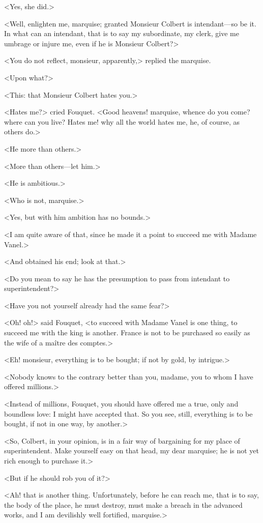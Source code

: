 <Yes, she did.>

<Well, enlighten me, marquise; granted Monsieur Colbert is intendant—so be it. In what can an intendant, that is to say my subordinate, my clerk, give me umbrage or injure me, even if he is Monsieur Colbert?>

<You do not reflect, monsieur, apparently,> replied the marquise.

<Upon what?>

<This: that Monsieur Colbert hates you.>

<Hates me?> cried Fouquet. <Good heavens! marquise, whence do you come? where can you live? Hates me! why all the world hates me, he, of course, as others do.>

<He more than others.>

<More than others—let him.>

<He is ambitious.>

<Who is not, marquise.>

<Yes, but with him ambition has no bounds.>

<I am quite aware of that, since he made it a point to succeed me with Madame Vanel.>

<And obtained his end; look at that.>

<Do you mean to say he has the presumption to pass from intendant to superintendent?>

<Have you not yourself already had the same fear?>

<Oh! oh!> said Fouquet, <to succeed with Madame Vanel is one thing, to succeed me with the king is another. France is not to be purchased so easily as the wife of a maître des comptes.>

<Eh! monsieur, everything is to be bought; if not by gold, by intrigue.>

<Nobody knows to the contrary better than you, madame, you to whom I have offered millions.>

<Instead of millions, Fouquet, you should have offered me a true, only and boundless love: I might have accepted that. So you see, still, everything is to be bought, if not in one way, by another.>

<So, Colbert, in your opinion, is in a fair way of bargaining for my place of superintendent. Make yourself easy on that head, my dear marquise; he is not yet rich enough to purchase it.>

<But if he should rob you of it?>

<Ah! that is another thing. Unfortunately, before he can reach me, that is to say, the body of the place, he must destroy, must make a breach in the advanced works, and I am devilishly well fortified, marquise.>

